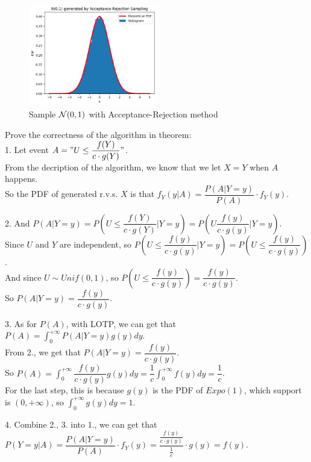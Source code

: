 \begin{homeworkProblem}
\begin{figure}[h]
    \centering
    \includegraphics[width=0.5\textwidth]{./figure/p5/accept_reject.png}
    \caption{Sample $\mathcal{N}(0,1)$ with Acceptance-Rejection method}
\end{figure}

Prove the correctness of the algorithm in theorem:\\
1. Let event $A = "U \leq \dfrac{f(Y)}{c\cdot g(Y)}"$.\\
From the decription of the algorithm, we know that we let $X=Y$ when $A$ happens.\\
So the PDF of generated r.v.s. $X$ is that $f_Y(y|A)=\dfrac{P(A|Y=y)}{P(A)}\cdot f_Y(y)$.

2. And $P(A|Y=y)=P(U\leq \dfrac{f(Y)}{c\cdot g(Y)}|Y=y)=P(U\dfrac{f(y)}{c\cdot g(y)}|Y=y)$.\\
Since $U$ and $Y$ are independent, so $P(U\leq \dfrac{f(y)}{c\cdot g(y)}|Y=y)=P(U\leq \dfrac{f(y)}{c\cdot g(y)})$.\\
And since $U\sim Unif(0,1)$, so $P(U\leq \dfrac{f(y)}{c\cdot g(y)})=\dfrac{f(y)}{c\cdot g(y)}$.\\
So $P(A|Y=y)=\dfrac{f(y)}{c\cdot g(y)}$.

3. As for $P(A)$, with LOTP, we can get that\\
$P(A)=\int_{0}^{+\infty}P(A|Y=y)g(y)dy$.\\
From 2., we get that $P(A|Y=y)=\dfrac{f(y)}{c\cdot g(y)}$.\\
So $P(A)=\int_{0}^{+\infty}\dfrac{f(y)}{c\cdot g(y)}g(y)dy=\dfrac{1}{c}\int_{0}^{+\infty}f(y)dy=\dfrac{1}{c}$.\\
For the last step, this is because $g(y)$ is the PDF of $Expo(1)$, which support is $(0,+\infty)$, so $\int_{0}^{+\infty}g(y)dy=1$.

4. Combine 2., 3. into 1., we can get that\\
$P(Y=y|A)=\dfrac{P(A|Y=y)}{P(A)}\cdot f_Y(y)=\dfrac{\frac{f(y)}{c\cdot g(y)}}{\frac{1}{c}}\cdot g(y)=f(y)$.


\end{homeworkProblem}
